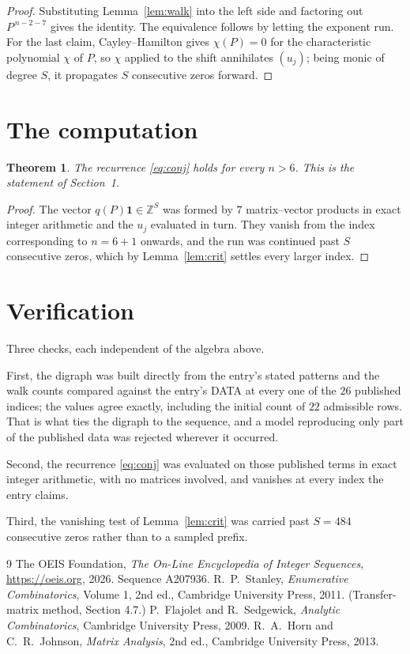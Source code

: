 \documentclass[11pt,a4paper]{article}
\theoremstyle{plain}
\newtheorem{theorem}{Theorem}
\theoremstyle{definition}
\begin{document}
\begin{proof}
Substituting Lemma~\ref{lem:walk} into the left side and factoring out
$P^{\,n-2-7}$ gives the identity. The equivalence follows by letting the exponent
run. For the last claim, Cayley--Hamilton gives $\chi(P)=0$ for the characteristic
polynomial $\chi$ of $P$, so $\chi$ applied to the shift annihilates $(u_j)$; being monic of
degree $S$, it propagates $S$ consecutive zeros forward.
\end{proof}

\section{The computation}

\begin{theorem}
The recurrence \eqref{eq:conj} holds for every $n>6$. This is the statement of
Section~1.
\end{theorem}

\begin{proof}
The vector $q(P)\mathbf{1}\in\mathbb{Z}^{S}$ was formed by $7$ matrix--vector
products in exact integer arithmetic and the $u_j$ evaluated in turn. They vanish from the
index corresponding to $n=6+1$ onwards, and the run was continued past $S$ consecutive
zeros, which by Lemma~\ref{lem:crit} settles every larger index.
\end{proof}

\section{Verification}

Three checks, each independent of the algebra above.

First, the digraph was built directly from the entry's stated patterns and the walk counts
compared against the entry's DATA at every one of the $26$ published indices; the
values agree exactly, including the initial count of $22$ admissible rows. That is
what ties the digraph to the sequence, and a model reproducing only part of the published
data was rejected wherever it occurred.

Second, the recurrence \eqref{eq:conj} was evaluated on those published terms in exact
integer arithmetic, with no matrices involved, and vanishes at every index the entry claims.

Third, the vanishing test of Lemma~\ref{lem:crit} was carried past $S=484$ consecutive
zeros rather than to a sampled prefix.

\begin{thebibliography}{9}
 The OEIS Foundation, \emph{The On-Line Encyclopedia of Integer
Sequences}, \url{https://oeis.org}, 2026. Sequence A207936.
 R.~P.~Stanley, \emph{Enumerative Combinatorics}, Volume 1, 2nd ed.,
Cambridge University Press, 2011. (Transfer-matrix method, Section 4.7.)
 P.~Flajolet and R.~Sedgewick, \emph{Analytic Combinatorics}, Cambridge
University Press, 2009.
 R.~A.~Horn and C.~R.~Johnson, \emph{Matrix Analysis}, 2nd ed., Cambridge
University Press, 2013.
\end{thebibliography}
\end{document}
